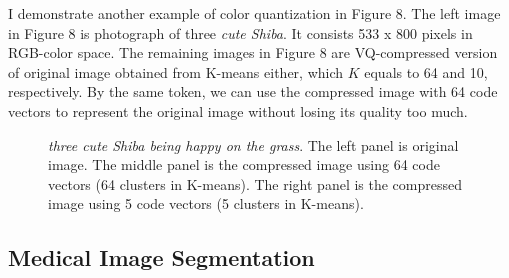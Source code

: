 \documentclass[a4paper]{article}
\begin{document}
I demonstrate another example of color quantization in Figure 8. The left image in Figure 8 is photograph of three \textit{cute Shiba}. It consists 533 x 800 pixels in RGB-color space. The remaining images in Figure 8 are VQ-compressed version of original image obtained from K-means either, which $K$ equals to 64 and 10, respectively. By the same token, we can use the compressed image with 64 code vectors to represent the original image without losing its quality too much.

\begin{figure}[h!]%
    \centering
    \caption{\textit{three cute Shiba being happy on the grass}. The left panel is original image. The middle panel is the compressed image using 64 code vectors (64 clusters in K-means). The right panel is the compressed image using 5 code vectors (5 clusters in K-means).}
\end{figure}


\subsection{Medical Image Segmentation}
\end{document}
